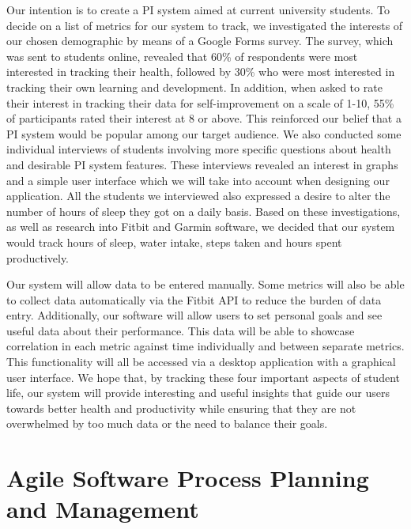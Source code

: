 \documentclass[12pt]{article}
\begin{document}
Our intention is to create a PI system aimed at current university students. To
decide on a list of metrics for our system to track, we investigated the
interests of our chosen demographic by means of a Google Forms survey. The
survey, which was sent to students online, revealed that 60\% of respondents
were most interested in tracking their health, followed by 30\% who were most
interested in tracking their own learning and development. In addition, when
asked to rate their interest in tracking their data for self-improvement on a
scale of 1-10, 55\% of participants rated their interest at 8 or above. This
reinforced our belief that a PI system would be popular among our target
audience. We also conducted some individual interviews of students involving
more specific questions about health and desirable PI system features. These
interviews revealed an interest in graphs and a simple user interface which we
will take into account when designing our application. All the students we
interviewed also expressed a desire to alter the number of hours of sleep they
got on a daily basis. Based on these investigations, as well as research into
Fitbit and Garmin software, we decided that our system would track hours of
sleep, water intake, steps taken and hours spent productively.\par

Our system will allow data to be entered manually. Some metrics will also be
able to collect data automatically via the Fitbit API to reduce the burden of
data entry. Additionally, our software will allow users to set personal goals
and see useful data about their performance. This data will be able to showcase
correlation in each metric against time individually and between separate
metrics. This functionality will all be accessed via a desktop application with
a graphical user interface. We hope that, by tracking these four important
aspects of student life, our system will provide interesting and useful
insights that guide our users towards better health and productivity while
ensuring that they are not overwhelmed by too much data or the need to balance
their goals.


\section{Agile Software Process Planning and Management}
\end{document}
